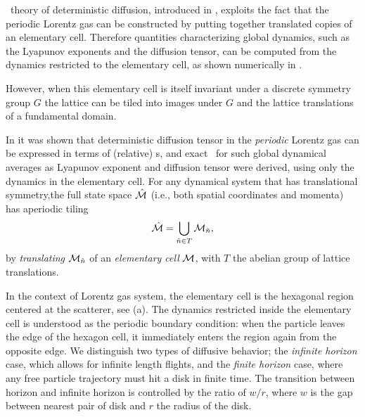 

\Po\ theory of deterministic diffusion, introduced in
, exploits the fact that the periodic Lorentz
gas can be constructed by putting together translated copies of an
elementary cell. Therefore quantities characterizing global dynamics,
such as the Lyapunov exponents and the diffusion tensor, can be computed
from the dynamics restricted to the elementary cell, as shown numerically
in .

However, when this elementary cell is itself invariant under a discrete
symmetry group $G$ the lattice can be tiled into images under $G$ and the
lattice translations of a fundamental domain.

In  it was shown that
deterministic diffusion tensor in the {\em periodic} Lorentz gas can be
expressed in terms of (relative) \po s, and exact \cycForm\ for such
global dynamical averages as Lyapunov exponent and diffusion tensor were
derived, using only the dynamics in the elementary cell. For any
dynamical system that has translational symmetry,the full state space
$\hat {{\cal M}}$ (i.e., both spatial coordinates and momenta) has aperiodic tiling
\[ %
\hM=\bigcup_{ \hn \in T} \pS_{\hn},
\] %
by {\em translating} ${\cal M}_{\hat n}$ of an {\em elementary cell} ${\cal M}$, with
$T$ the abelian group of lattice translations.

In the context of Lorentz gas system, the elementary cell is the
hexagonal region centered at the scatterer, see
 (a). The dynamics restricted inside the
elementary cell is understood as the periodic boundary condition: when
the particle leaves the edge of the hexagon cell, it immediately enters
the region again from the opposite edge. We distinguish two types of
diffusive behavior; the {\em infinite horizon} case, which allows for
infinite length flights, and the {\em finite horizon} case, where any
free particle trajectory must hit a disk in finite time. The transition
between horizon and infinite horizon is controlled by the ratio of $w/r$,
where $w$ is the gap between nearest pair of disk and $r$ the radius of
the disk.

